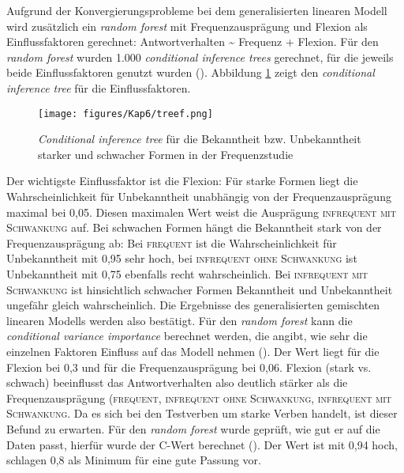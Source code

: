Aufgrund der Konvergierungsprobleme bei dem generalisierten linearen Modell wird zusätzlich ein \textit{random forest} mit Frequenzausprägung und Flexion als Einflussfaktoren gerechnet: Antwortverhalten \~{} Frequenz + Flexion. Für den \textit{random forest} wurden 1.000 \textit{conditional inference trees} gerechnet, für die jeweils beide Einflussfaktoren genutzt wurden (\cite[297]{Levshina.2015}).  Abbildung \ref{treef} zeigt den \textit{conditional inference tree} für die Einflussfaktoren.

\begin{figure}
\texttt{[image: figures/Kap6/treef.png]} 
\caption{\textit{Conditional inference tree} für die Bekanntheit bzw. Unbekanntheit starker und schwacher Formen in der Frequenzstudie}
\label{treef}
\end{figure}

\begin{sloppypar}
Der wichtigste Einflussfaktor ist die Flexion: Für starke Formen liegt die Wahrscheinlichkeit für Unbekanntheit unabhängig von der Frequenzausprägung maximal bei 0,05. Diesen maximalen Wert weist die Ausprägung \textsc{infrequent mit Schwankung} auf. Bei schwachen Formen hängt die Bekanntheit stark von der Frequenzausprägung ab: Bei \textsc{frequent} ist die Wahrscheinlichkeit für Unbekanntheit mit 0,95 sehr hoch, bei \textsc{infrequent ohne Schwankung} ist Unbekanntheit mit 0,75 ebenfalls recht wahrscheinlich. Bei \textsc{infrequent mit Schwankung} ist hinsichtlich schwacher Formen Bekanntheit und Unbekanntheit ungefähr gleich wahrscheinlich. Die Ergebnisse des generalisierten gemischten linearen Modells werden also bestätigt. Für den \textit{random forest} kann die \textit{conditional variance importance} berechnet werden, die angibt, wie sehr die einzelnen Faktoren Einfluss auf das Modell nehmen (\cite[298--299]{Levshina.2015}). Der Wert liegt für die Flexion bei 0,3 und für die Frequenzausprägung bei 0,06. Flexion (stark vs. schwach) beeinflusst das Antwortverhalten also deutlich stärker als die Frequenzausprägung (\textsc{frequent}, \textsc{infrequent ohne Schwankung}, \textsc{infrequent mit Schwankung}. Da es sich bei den Testverben um starke Verben handelt, ist dieser Befund zu erwarten. Für den \textit{random forest} wurde geprüft, wie gut er auf die Daten passt, hierfür wurde der C-Wert berechnet (\cite[299]{Levshina.2015}). Der Wert ist mit 0,94 hoch, \textcite[156]{Tagliamonte.2012} schlagen 0,8 als Minimum für eine gute Passung vor.
\end{sloppypar}

